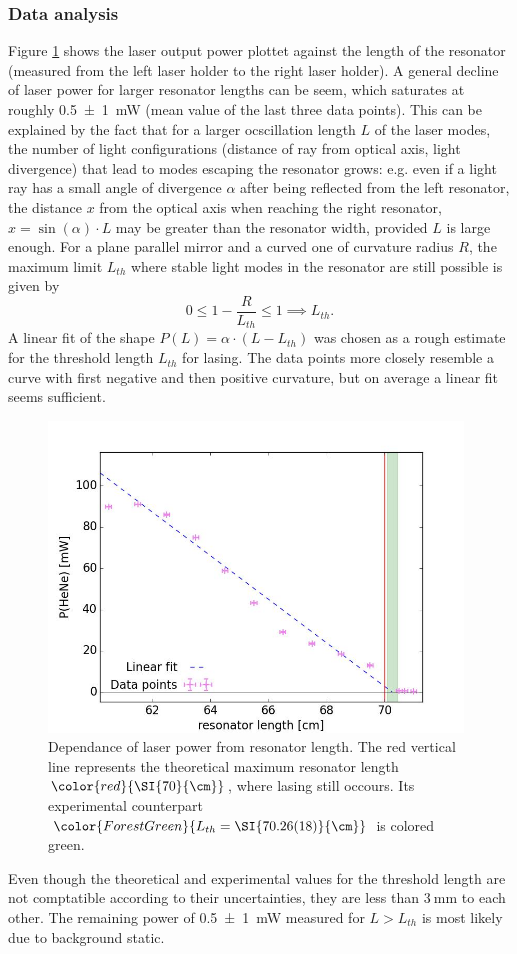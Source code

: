 \documentclass[../main.tex]{subfiles}
\begin{document}
\subsubsection*{Data analysis}
    Figure \ref{fig:4-Laserleistung-Resonatorlaenge} shows the laser output power plottet against the length of the resonator (measured from the left laser holder to the right laser holder). A general decline of laser power for larger resonator lengths can be seem, which saturates at roughly \SI{0.5(10)}{\mW} (mean value of the last three data points). This can be explained by the fact that for a larger ocscillation length $L$ of the laser modes, the number of light configurations (distance of ray from optical axis, light divergence) that lead to modes escaping the resonator grows: e.g. even if a light ray has a small angle of divergence $\alpha$ after being reflected from the left resonator, the distance $x$ from the optical axis when reaching the right resonator, $x = \sin(\alpha)\cdot L$ may be greater than the resonator width, provided $L$ is large enough. For a plane parallel mirror and a curved one of curvature radius $R$, the maximum limit $L_{th}$ where stable light modes in the resonator are still possible is given by 
    \[
        0 \le 1 - \frac{R}{L_{th}} \le 1 \implies L_{th}.    
    \]
    A linear fit of the shape $P(L) = \alpha\cdot (L - L_{th})$ was chosen as a rough estimate for the threshold length $L_{th}$ for lasing. The data points more closely resemble a curve with first negative and then positive curvature, but on average a linear fit seems sufficient.

    \begin{figure}[H]
        \centering
        \includegraphics[width = 11cm]{Bilddateien/4/4-Laserleistung-Resonatorlaenge.jpg}
        \caption{Dependance of laser power from resonator length. The red vertical line represents the theoretical maximum resonator length $\color{red}{\SI{70}{\cm}}$, where lasing still occours. Its experimental counterpart $\color{ForestGreen}{L_{th} = \SI{70.26(18)}{\cm}}$  is colored green.}
        \label{fig:4-Laserleistung-Resonatorlaenge}
    \end{figure}

    \noindent Even though the theoretical and experimental values for the threshold length are not comptatible according to their uncertainties, they are less than $\SI{3}{\mm}$ to each other. The remaining power of \SI{0.5(10)}{\mW} measured for $L > L_{th}$ is most likely due to background static.
\end{document}
